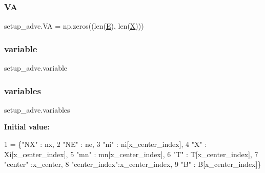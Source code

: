 \mbox{\label{namespacesetup__adve_a7ac7f5d3fe6d7f6dcdc2c947687000c4}} 
\subsubsection{\texorpdfstring{VA}{VA}}
{\footnotesize\ttfamily setup\+\_\+adve.\+VA = np.\+zeros((len(\hyperlink{namespacesetup__adve_a924af0e190ae028ed71b0d7b9dd75fed}{E}), len(\hyperlink{namespacesetup__adve_ac58005e2708a29ed334e0542dd68d336}{X})))}

\mbox{\label{namespacesetup__adve_a4ba70ed6e237e9d8f011a2696dea13c9}} 
\subsubsection{\texorpdfstring{variable}{variable}}
{\footnotesize\ttfamily setup\+\_\+adve.\+variable}

\mbox{\label{namespacesetup__adve_a4ebd374d49d05aea60925f94e1478ffa}} 
\subsubsection{\texorpdfstring{variables}{variables}}
{\footnotesize\ttfamily setup\+\_\+adve.\+variables}

{\bfseries Initial value\+:}
\begin{DoxyCode}
1 =  \{\textcolor{stringliteral}{"NX"}       : nx,
2              \textcolor{stringliteral}{"NE"}       : ne,
3              \textcolor{stringliteral}{"ni"}       : ni[x\_center\_index],
4              \textcolor{stringliteral}{"X"}        : Xi[x\_center\_index],
5              \textcolor{stringliteral}{"mn"}       : mn[x\_center\_index],
6              \textcolor{stringliteral}{"T"}        : T[x\_center\_index],
7              \textcolor{stringliteral}{"center"}   :x\_center,
8              \textcolor{stringliteral}{"center\_index"}:x\_center\_index,
9              \textcolor{stringliteral}{"B"}        : B[x\_center\_index]\}
\end{DoxyCode}
\mbox{\label{namespacesetup__adve_ac58005e2708a29ed334e0542dd68d336}} 
